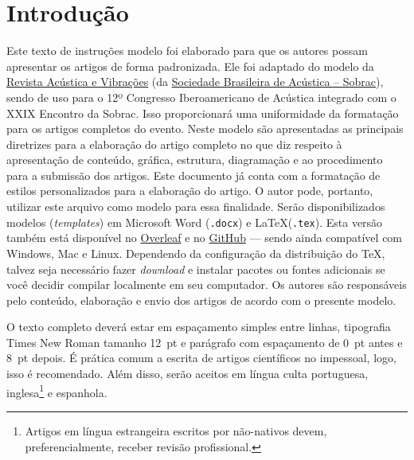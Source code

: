 \documentclass[12pt, a4paper, twoside, twocolumn]{article}
\begin{document}
 \setcounter{page}{1} 
\clearpage %

\section{Introdução}

Este texto de instruções modelo foi elaborado para que os autores possam apresentar os artigos de forma padronizada. 
Ele foi adaptado do modelo da \href{https://revista.acustica.org.br}{Revista Acústica e Vibrações} (da \href{https://acustica.org.br}{Sociedade Brasileira de Acústica -- Sobrac}), sendo de uso para o 12º Congresso Iberoamericano de Acústica integrado com o  XXIX Encontro da Sobrac.
%
Isso proporcionará uma uniformidade da formatação para os artigos completos do evento.
Neste modelo são apresentadas as principais diretrizes para a elaboração do artigo completo no que diz respeito à apresentação de conteúdo, gráfica, estrutura, diagramação e ao procedimento para a submissão dos artigos. 
Este documento já conta com a formatação de estilos personalizados para a elaboração do artigo. O autor pode, portanto, utilizar este arquivo como modelo para essa finalidade. Serão disponibilizados modelos (\textit{templates}) em Microsoft Word (\texttt{.docx}) e \LaTeX\xspace (\texttt{.tex}). Esta versão também está disponível no \href{https://www.overleaf.com/read/rnfjxkknksnd}{Overleaf} e no \href{https://github.com/willdfonseca/fia2020}{GitHub} --- sendo ainda compatível com Windows, Mac e Linux.
Dependendo da configuração da distribuição do TeX, talvez seja necessário fazer \textit{download} e instalar pacotes ou fontes adicionais se você decidir compilar localmente em seu computador.
Os autores são responsáveis pelo conteúdo, elaboração e envio dos artigos de acordo com o presente modelo.


O texto completo deverá estar em espaçamento simples entre linhas, tipografia Times New Roman tamanho 12~pt e parágrafo com espaçamento de 0~pt antes e 8~pt depois. É prática comum a escrita de artigos científicos no impessoal, logo,  isso é recomendado. Além disso, serão aceitos em língua culta portuguesa, inglesa\footnote{Artigos em língua estrangeira escritos por não-nativos devem, preferencialmente, receber revisão profissional.} e espanhola. 
\end{document}
